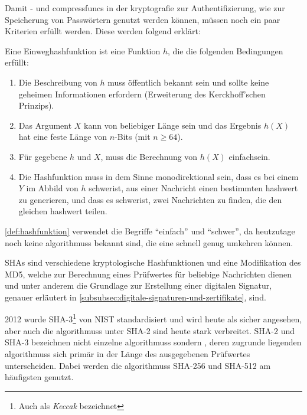 Damit - und \glspl{compressfunc} in der \gls{kryptografie} zur Authentifizierung, wie \zb    zur Speicherung von Passwörtern genutzt werden können, müssen noch ein paar Kriterien erfüllt werden.
Diese werden folgend erklärt:

\begin{definition}[label=def:hashfunktion]
    Eine Einweghashfunktion ist eine Funktion $h$, die die folgenden Bedingungen erfüllt\autocite[\vglf][\pagef~17]{anal-des-hash-function-2003}:
    \begin{enumerate}
        \item Die Beschreibung von $h$ muss öffentlich bekannt sein und sollte keine geheimen Informationen erfordern (Erweiterung des Kerckhoff'schen Prinzips\autocite[]{petitcolas-information-nodate}).
        \item Das Argument $X$ kann von beliebiger Länge sein und das Ergebnis $h(X)$ hat eine feste Länge von $n$-Bits (mit $n \geq64$).
        \item Für gegebene $h$ und $X$, muss die Berechnung von $h(X)$ einfach\footnotemark sein.
        \item Die Hashfunktion muss in dem Sinne monodirektional sein, dass es bei einem $Y$ im Abbild von $h$ schwer\footnotemark[\value{footnote}] ist, aus einer Nachricht einen bestimmten \gls{hashwert} zu generieren, und dass es schwer\footnotemark[\value{footnote}] ist, zwei Nachrichten zu finden, die den gleichen \gls{hashwert} teilen.
    \end{enumerate}
\end{definition}

\autoref{def:hashfunktion} verwendet die Begriffe \enquote{einfach} und \enquote{schwer}, da heutzutage noch keine \glspl{algorithmus} bekannt sind, die eine  schnell genug umkehren können.\autocite[\pagef~234]{buchmann-einfuhrung-2016}

\acfp{SHA} sind verschiedene kryptologische Hashfunktionen und eine Modifikation des \gls{MD5}, welche zur Berechnung eines Prüfwertes für beliebige Nachrichten dienen und unter anderem die Grundlage zur Erstellung einer digitalen Signatur, genauer erläutert in \autoref{subsubsec:digitale-signaturen-und-zertifikate}, sind\autocite[]{WhatisSH81:online}.

2012 wurde \ac{SHA}-3\footnote{Auch als \textit{Keccak} bezeichnet}  von \ac{NIST} standardisiert und wird heute als sicher angesehen\autocite[\pagef~239]{buchmann-einfuhrung-2016}, aber auch die \glspl{algorithmus} unter \ac{SHA}-2 sind heute stark verbreitet.
\ac{SHA}-2 und \ac{SHA}-3 bezeichnen nicht einzelne \glspl{algorithmus} sondern , deren zugrunde liegenden \glspl{algorithmus} sich primär in der Länge des ausgegebenen Prüfwertes unterscheiden.
Dabei werden die \glspl{algorithmus} \ac{SHA}-256 und \ac{SHA}-512 am häufigsten genutzt.